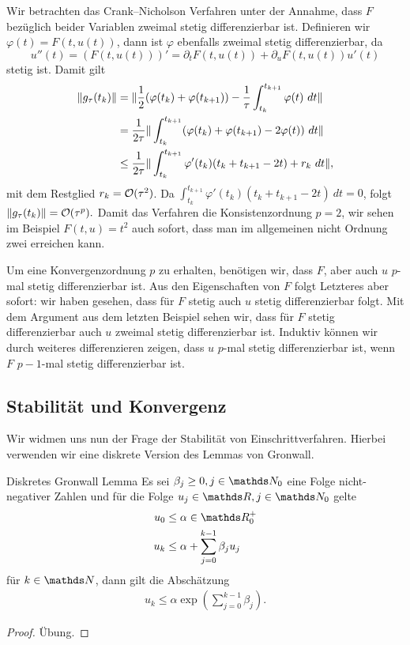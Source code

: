 \begin{example}{}{}
Wir betrachten das Crank--Nicholson Verfahren unter der Annahme, dass $F$ bezüglich beider Variablen zweimal stetig differenzierbar ist. Definieren wir $\varphi(t) = F(t,u(t))$, dann ist $\varphi$  ebenfalls zweimal stetig differenzierbar, da
$$ u''(t) = (F(t,u(t)))' = \partial_t F(t,u(t)) + \partial_u F(t,u(t)) u'(t) $$
stetig ist. Damit gilt
%
\begin{align*} 
\|g_\tau(t_k)\| &= \|\frac{1}2(\varphi(t_k)+\varphi(t_{k+1})) - \frac{1}\tau \int_{t_k}^{t_{k+1}} \varphi(t)~dt\|\\
&=    \frac{1}{2\tau}  \Vert \int_{t_k}^{t_{k+1}} (\varphi(t_k)+\varphi(t_{k+1})-2\varphi(t))~dt  \Vert \\
&\leq    \frac{1}{2\tau}   \Vert\int_{t_k}^{t_{k+1}} \varphi'(t_k)(t_k+t_{k+1}-2t) + r_k ~dt \Vert   ,
\end{align*}
%
mit dem Restglied $r_k={\cal O}(\tau^2)$. Da $\int_{t_k}^{t_{k+1}} \varphi'(t_k)(t_k+t_{k+1}-2t) ~dt = 0$, folgt 
$ \Vert g_\tau(t_k) \Vert = {\cal O}(\tau^p).$
Damit das Verfahren die Konsistenzordnung $p=2$, wir sehen im Beispiel $F(t,u) = t^2$ auch sofort, dass man im allgemeinen nicht Ordnung zwei erreichen kann. 
\end{example}
%
Um eine Konvergenzordnung $p$ zu erhalten, benötigen wir, dass $F$, aber auch $u$ $p$-mal stetig differenzierbar ist. Aus den Eigenschaften von $F$ folgt Letzteres aber sofort: wir haben gesehen, dass für $F$ stetig auch $u$ stetig differenzierbar folgt. Mit dem Argument aus dem letzten Beispiel sehen wir, dass für $F$ stetig differenzierbar auch $u$ zweimal stetig differenzierbar ist. Induktiv können wir durch weiteres differenzieren zeigen, dass $u$ $p$-mal stetig differenzierbar ist, wenn $F$ $p-1$-mal stetig differenzierbar ist. 
%
\subsection{Stabilität und Konvergenz}

Wir widmen uns nun der Frage der Stabilität von Einschrittverfahren. Hierbei verwenden wir eine diskrete Version des Lemmas von Gronwall.

\begin{lemma}{Diskretes Gronwall Lemma}{}
Es sei $\beta_j \geq 0, j\in\N_0$ eine Folge nicht-negativer Zahlen und für die Folge $u_j\in\R, j\in\N_0$ gelte 
%
\begin{align*}
u_0&\leq \alpha\in\R^+_0\\
u_k&\leq \alpha + \sum_{j=0}^{k-1} \beta_j u_j
\end{align*}
%
für $k\in\N$, dann gilt die Abschätzung
%
\begin{align*}
u_k \leq \alpha \exp\left(\sum_{j=0}^{k-1} \beta_j\right).
\end{align*}
\end{lemma}
%
\begin{proof}
Übung.
\end{proof}
%

